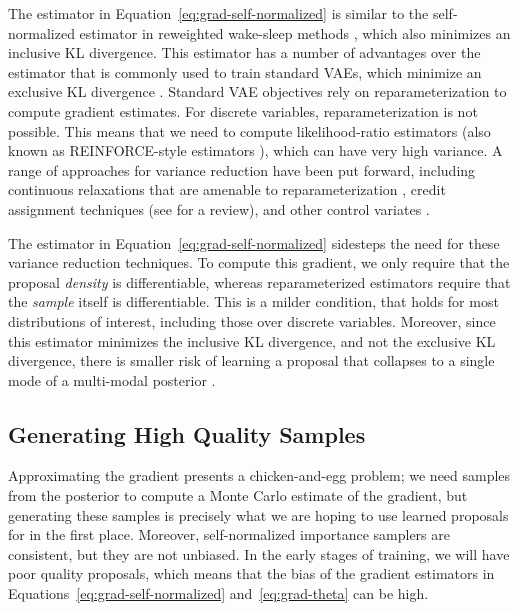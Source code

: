 \documentclass{article}
\theoremstyle{definition}
\begin{document}
The estimator in Equation~\ref{eq:grad-self-normalized} is similar to the self-normalized estimator in reweighted wake-sleep methods \cite{bornschein2014reweighted}, which also minimizes an inclusive KL divergence. This estimator has a number of advantages over the estimator that is commonly used to train standard VAEs, which minimize an exclusive KL divergence \cite{le2019revisiting}. Standard VAE objectives rely on reparameterization to compute gradient estimates. For discrete variables, reparameterization is not possible. This means that we need to compute likelihood-ratio estimators (also known as REINFORCE-style estimators \cite{williams1992simple}), which can have very high variance. A range of approaches for variance reduction have been put forward, including continuous relaxations that are amenable to reparameterization \cite{maddison2017concrete,jang2017categorical}, credit assignment techniques (see \cite{weber2019credit} for a review), and other control variates \cite{mnih2016variational,tucker2017rebar,grathwohl2018backpropagation}. 

The estimator in Equation~\ref{eq:grad-self-normalized} sidesteps the need for these variance reduction techniques. To compute this gradient, we only require that the proposal \emph{density} is differentiable, whereas reparameterized estimators require that the \emph{sample} itself is differentiable. This is a milder condition, that holds for most distributions of interest, including those over discrete variables. Moreover, since this estimator minimizes the inclusive KL divergence, and not the exclusive KL divergence, there is smaller risk of learning a proposal that collapses to a single mode of a multi-modal posterior \cite{le2019revisiting}.

\subsection{Generating High Quality Samples}
Approximating the gradient presents a chicken-and-egg problem; we need samples from the posterior to compute a Monte Carlo estimate of the gradient, but generating these samples is precisely what we are hoping to use learned proposals for in the first place. Moreover, self-normalized importance samplers are consistent, but they are not unbiased. In the early stages of training, we will have poor quality proposals, which means that the bias of the gradient estimators in Equations~\ref{eq:grad-self-normalized} and~\ref{eq:grad-theta} can be high. 
\end{document}
